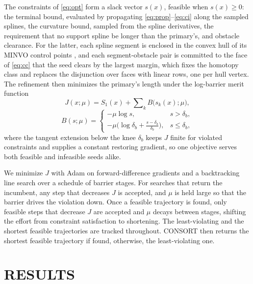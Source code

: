 \documentclass[letterpaper, 10 pt, conference]{ieeeconf}
\theoremstyle{remark}
\begin{document}
The constraints of \eqref{eq:opt} form a slack vector $s(x)$, feasible when
$s(x) \ge 0$: the terminal bound, evaluated by propagating
\eqref{eq:prop}--\eqref{eq:ci} along the sampled splines, the curvature
bound, sampled from the spline derivatives, the requirement that no support
spline be longer than the primary's, and obstacle clearance. For the latter,
each spline segment is enclosed in the convex hull of its MINVO control
points \cite{tordesillas2022minvo}, and each segment-obstacle pair is
committed to the face of \eqref{eq:cc} that the seed clears by the largest
margin, which fixes the homotopy class and replaces the disjunction over
faces with linear rows, one per hull vertex. The refinement then minimizes
the primary's length under the log-barrier merit function
\begin{equation}
  J(x;\mu) = S_1(x) + \sum\nolimits_k B\big(s_k(x);\mu\big),
  \label{eq:merit}
\end{equation}
\begin{equation}
  B(s;\mu) =
  \begin{cases}
    -\mu \log s, & s > \delta_b, \\[2pt]
    -\mu \big( \log\delta_b + \tfrac{s-\delta_b}{\delta_b} \big), & s \le \delta_b,
  \end{cases}
  \label{eq:barrier}
\end{equation}
where the tangent extension below the knee $\delta_b$ keeps $J$ finite for
violated constraints and supplies a constant restoring gradient, so one
objective serves both feasible and infeasible seeds alike.

We minimize $J$ with Adam \cite{kingma2015adam} on forward-difference
gradients and a backtracking line search over a schedule of barrier stages.
For searches that return the incumbent, any step that decreases $J$ is accepted, and $\mu$ is held
large so that the barrier drives the violation down. Once a feasible trajectory is found,
only feasible steps that decrease $J$ are
accepted and $\mu$ decays between stages, shifting the effort from
constraint satisfaction to shortening. The least-violating and the shortest
feasible trajectories are tracked throughout. CONSORT then returns the shortest feasible 
trajectory if found, otherwise, the least-violating one.
\section{RESULTS}
\label{sec:results}
\end{document}
